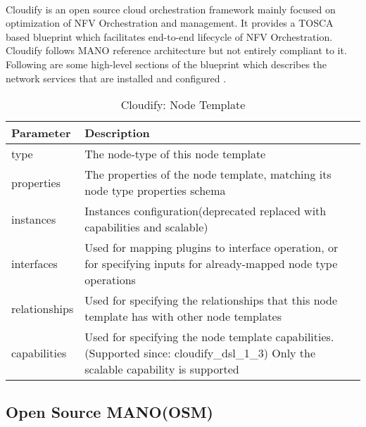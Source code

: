 \paragraph{}
Cloudify is an open source cloud orchestration framework mainly focused on optimization of NFV Orchestration and management. It provides a TOSCA based blueprint which facilitates end-to-end lifecycle of NFV Orchestration. Cloudify follows MANO reference architecture but not entirely compliant to it\cite{de2018network}. Following are some high-level sections of the blueprint which describes the network services that are installed and configured \cite{CloudifySchemaDocumentation}.
    \begin{table}[h]
        \centering
    \begin{tabular}{ |p{4cm}|p{10cm}|}
        \hline
        \textbf{Parameter} & \textbf{Description} \\
        \hline
         
         type & The node-type of this node template \\
         \hline
         properties &   The properties of the node template, matching its node type properties schema \\
         \hline
         instances &    Instances configuration(deprecated replaced with capabilities and scalable) \\
         \hline
         interfaces  & Used for mapping plugins to interface operation, or for specifying inputs for already-mapped node type operations \\
         \hline
         relationships &    Used for specifying the relationships that this node template has with other node templates \\
         \hline
         capabilities & Used for specifying the node template capabilities. (Supported since: cloudify\_dsl\_1\_3) Only the scalable capability is supported\\
         \hline
    \end{tabular}
    \caption{Cloudify: Node Template}
    \label{tab:Cloudify_node_template}
 \end{table}
\subsection{Open Source MANO(OSM)}
\label{SecOSM}
